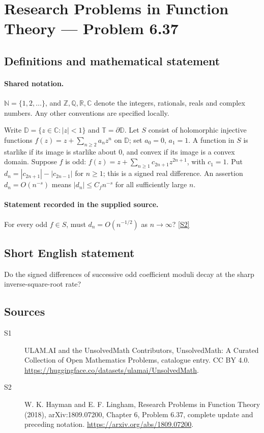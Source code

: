 \documentclass[11pt]{article}
\newcommand{\sref}[2]{\hyperlink{source:#1:#2}{[S#2]}}
\begin{document}
\section{Research Problems in Function Theory — Problem 6.37}\label{statement}

\subsection{Definitions and mathematical statement}

\paragraph{Shared notation.}$\mathbb N=\{1,2,\ldots\}$, and $\mathbb Z,\mathbb Q,\mathbb R,\mathbb C$ denote the integers, rationals, reals and complex numbers. Any other conventions are specified locally.


Write $\mathbb D=\{z\in\mathbb C:|z|<1\}$ and $\mathbb T=\partial\mathbb D$. Let $S$ consist of holomorphic injective functions $f(z)=z+\sum_{n\ge2}a_nz^n$ on $\mathbb D$; set $a_0=0$, $a_1=1$. A function in $S$ is starlike if its image is starlike about $0$, and convex if its image is a convex domain. Suppose $f$ is odd: $f(z)=z+\sum_{n\ge1}c_{2n+1}z^{2n+1}$, with $c_1=1$. Put $d_n=|c_{2n+1}|-|c_{2n-1}|$ for $n\ge1$; this is a signed real difference. An assertion $d_n=O(n^{-s})$ means $|d_n|\le C_f n^{-s}$ for all sufficiently large $n$.
\paragraph{Statement recorded in the supplied source.}
For every odd $f\in S$, must $d_n=O(n^{-1/2})$ as $n\to\infty$? \sref{statement}{2}
\subsection{Short English statement}
Do the signed differences of successive odd coefficient moduli decay at the sharp inverse-square-root rate?
\subsection{Sources}
\begin{description}
\item[\hypertarget{source:statement:1}{S1}] ULAM.AI and the UnsolvedMath Contributors, UnsolvedMath: A Curated Collection of Open Mathematics Problems, catalogue entry. CC BY 4.0. \url{https://huggingface.co/datasets/ulamai/UnsolvedMath}.
\item[\hypertarget{source:statement:2}{S2}] W. K. Hayman and E. F. Lingham, Research Problems in Function Theory (2018), arXiv:1809.07200, Chapter 6, Problem 6.37, complete update and preceding notation. \url{https://arxiv.org/abs/1809.07200}.
\end{description}
\label{end:statement}
\end{document}
